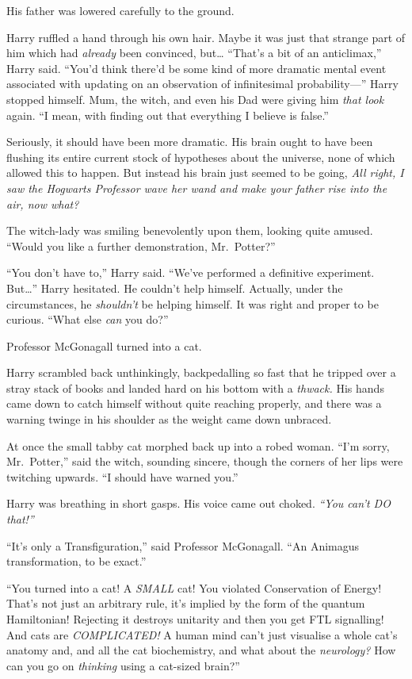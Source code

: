 His father was lowered carefully to the ground.

Harry ruffled a hand through his own hair. Maybe it was just that
strange part of him which had \emph{already} been convinced, but\ldots{}
``That's a bit of an anticlimax,'' Harry said. ``You'd think there'd be
some kind of more dramatic mental event associated with updating on an
observation of infinitesimal probability---'' Harry stopped himself.
Mum, the witch, and even his Dad were giving him \emph{that look} again.
``I mean, with finding out that everything I believe is false.''

Seriously, it should have been more dramatic. His brain ought to have
been flushing its entire current stock of hypotheses about the universe,
none of which allowed this to happen. But instead his brain just seemed
to be going, \emph{All right, I saw the Hogwarts Professor wave her wand
and make your father rise into the air, now what?}

The witch-lady was smiling benevolently upon them, looking quite amused.
``Would you like a further demonstration, Mr.~Potter?''

``You don't have to,'' Harry said. ``We've performed a definitive
experiment. But\ldots{}'' Harry hesitated. He couldn't help himself.
Actually, under the circumstances, he \emph{shouldn't} be helping
himself. It was right and proper to be curious. ``What else \emph{can}
you do?''

Professor McGonagall turned into a cat.

Harry scrambled back unthinkingly, backpedalling so fast that he tripped
over a stray stack of books and landed hard on his bottom with a
\emph{thwack.} His hands came down to catch himself without quite
reaching properly, and there was a warning twinge in his shoulder as the
weight came down unbraced.

At once the small tabby cat morphed back up into a robed woman. ``I'm
sorry, Mr.~Potter,'' said the witch, sounding sincere, though the
corners of her lips were twitching upwards. ``I should have warned
you.''

Harry was breathing in short gasps. His voice came out choked.
\emph{``You can't DO that!''}

``It's only a Transfiguration,'' said Professor McGonagall. ``An
Animagus transformation, to be exact.''

``You turned into a cat! A \emph{SMALL} cat! You violated Conservation
of Energy! That's not just an arbitrary rule, it's implied by the form
of the quantum Hamiltonian! Rejecting it destroys unitarity and then you
get FTL signalling! And cats are \emph{COMPLICATED!} A human mind can't
just visualise a whole cat's anatomy and, and all the cat biochemistry,
and what about the \emph{neurology?} How can you go on \emph{thinking}
using a cat-sized brain?''

